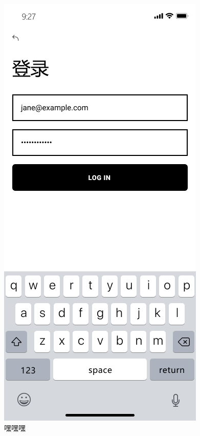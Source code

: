 \documentclass[UTF8]{ctexart}
\begin{document}
\begin{figure}[htbp]
    \centering
    \includegraphics[width=\linewidth]{Login.png}
    \caption{嘿嘿嘿} 
    \label{1}
\end{figure}
\end{document}
